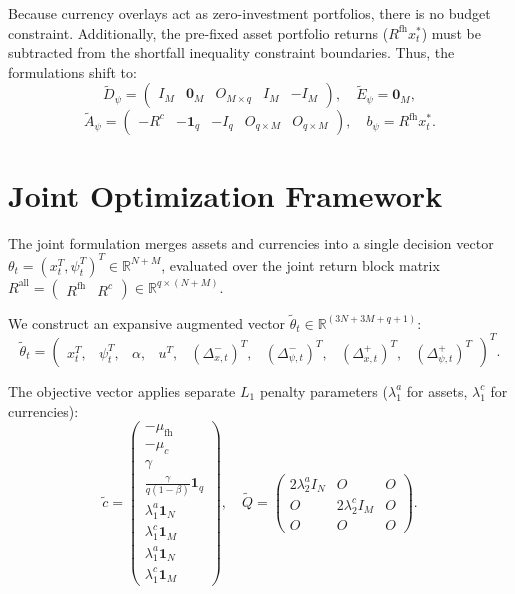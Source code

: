 Because currency overlays act as zero-investment portfolios, there is no budget constraint. Additionally, the pre-fixed asset portfolio returns ($R^{\text{fh}} x_t^*$) must be subtracted from the shortfall inequality constraint boundaries. Thus, the formulations shift to:
\begin{equation*}
    \tilde{D}_{\psi} = \begin{pmatrix} 
    I_M & \mathbf{0}_M & O_{M \times q} & I_M & -I_M 
    \end{pmatrix}, \quad \tilde{E}_{\psi} = \mathbf{0}_M,
\end{equation*}
\begin{equation*}
    \tilde{A}_{\psi} = \begin{pmatrix} 
    -R^c & -\mathbf{1}_q & -I_q & O_{q \times M} & O_{q \times M} 
    \end{pmatrix}, \quad b_{\psi} = R^{\text{fh}} x_t^*.
\end{equation*}

\section{Joint Optimization Framework}

The joint formulation merges assets and currencies into a single decision vector $\theta_t = (x_t^T, \psi_t^T)^T \in \mathbb{R}^{N+M}$, evaluated over the joint return block matrix $R^{\text{all}} = \begin{pmatrix} R^{\text{fh}} & R^c \end{pmatrix} \in \mathbb{R}^{q \times (N+M)}$.

We construct an expansive augmented vector $\tilde{\theta}_t \in \mathbb{R}^{(3N + 3M + q + 1)}$:
\begin{equation*}
    \tilde{\theta}_t = \begin{pmatrix} x_t^T, & \psi_t^T, & \alpha, & u^T, & (\Delta_{x,t}^-)^T, & (\Delta_{\psi,t}^-)^T, & (\Delta_{x,t}^+)^T, & (\Delta_{\psi,t}^+)^T \end{pmatrix}^T.
\end{equation*}

The objective vector applies separate $L_1$ penalty parameters ($\lambda_1^a$ for assets, $\lambda_1^c$ for currencies):
\begin{equation*}
    \tilde{c} = \begin{pmatrix} -\mu_{\text{fh}} \\ -\mu_c \\ \gamma \\ \frac{\gamma}{q(1-\beta)} \mathbf{1}_q \\ \lambda_1^a \mathbf{1}_N \\ \lambda_1^c \mathbf{1}_M \\ \lambda_1^a \mathbf{1}_N \\ \lambda_1^c \mathbf{1}_M \end{pmatrix}, \quad 
    \tilde{Q} = \begin{pmatrix} 
    2\lambda_2^a I_N & O & O \\ 
    O & 2\lambda_2^c I_M & O \\ 
    O & O & O 
    \end{pmatrix}.
\end{equation*}

